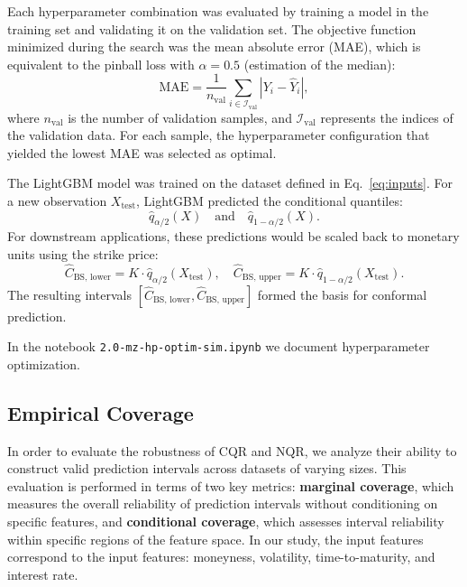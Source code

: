 \documentclass{article}
\theoremstyle{definition}
\begin{document}
Each hyperparameter combination was evaluated by training a model in the training set and validating it on the validation set. The objective function minimized during the search was the mean absolute error (MAE), which is equivalent to the pinball loss with $\alpha=0.5$ (estimation of the median):
\begin{equation}
\label{eq:mae}
\text{MAE} = \frac{1}{n_{\text{val}}} \sum_{i \in \mathcal{I}_{\text{val}}} \left| Y_i - \hat{Y}_i \right|,
\end{equation}
where $n_{\text{val}}$ is the number of validation samples, and $\mathcal{I}_{\text{val}}$ represents the indices of the validation data. For each sample, the hyperparameter configuration that yielded the lowest MAE was selected as optimal.

The LightGBM model was trained on the dataset defined in Eq.~\eqref{eq:inputs}. For a new observation $X_{\text{test}}$, LightGBM predicted the conditional quantiles:
\begin{equation}
\hat{q}_{\alpha/2}(X) \quad \text{and} \quad \hat{q}_{1-\alpha/2}(X).
\end{equation}
For downstream applications, these predictions would be scaled back to monetary units using the strike price:
\begin{equation}
\hat{C}_{\text{BS, lower}} = K \cdot \hat{q}_{\alpha/2}(X_{\text{test}}), \quad \hat{C}_{\text{BS, upper}} = K \cdot \hat{q}_{1-\alpha/2}(X_{\text{test}}).
\end{equation}
The resulting intervals $[\hat{C}_{\text{BS, lower}}, \hat{C}_{\text{BS, upper}}]$ formed the basis for conformal prediction.

In the notebook \texttt{2.0-mz-hp-optim-sim.ipynb} we document hyperparameter optimization.

\subsection{Empirical Coverage}

In order to evaluate the robustness of CQR and NQR, we analyze their ability to construct valid prediction intervals across datasets of varying sizes. This evaluation is performed in terms of two key metrics: \textbf{marginal coverage}, which measures the overall reliability of prediction intervals without conditioning on specific features, and \textbf{conditional coverage}, which assesses interval reliability within specific regions of the feature space. In our study, the input features correspond to the input features: moneyness, volatility, time-to-maturity, and interest rate.
\end{document}
